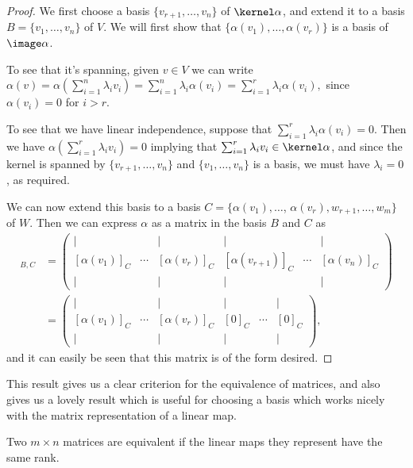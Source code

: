 \begin{proof}
    We first choose a basis $\{v_{r + 1}, \dots, v_n\}$ of $\kernel \alpha$, and extend it to a basis $B = \{v_1, \dots, v_n\}$ of $V$.
    We will first show that $\{\alpha(v_1), \dots, \alpha(v_r)\}$ is a basis of $\image \alpha$.

    To see that it's spanning, given $v \in V$ we can write
    $\alpha(v) = \alpha\left(\sum_{i = 1}^n \lambda_i v_i\right) = \sum_{i = 1}^n \lambda_i \alpha(v_i) = \sum_{i =1}^r \lambda_i \alpha(v_i),
    $
    since $\alpha(v_i) = 0$ for $i > r$.
    
    To see that we have linear independence, suppose that $\sum_{i = 1}^r \lambda_i \alpha(v_i) = 0$. Then we have
    $
\alpha\left(\sum_{i = 1}^r \lambda_i v_i\right) = 0$ implying that
$\sum_{i = 1}^r \lambda_i v_i \in \kernel \alpha$,
    and since the kernel is spanned by $\{v_{r + 1}, \dots, v_n\}$ and $\{v_1, \dots, v_n\}$ is a basis, we must have $\lambda_i = 0$, as required.

    We can now extend this basis to a basis $C = \{\alpha(v_1), \dots$, $\alpha(v_r), w_{r + 1}, \dots, w_m \}$ of $W$. Then we can express $\alpha$ as a matrix in the basis $B$ and $C$ as
    \begin{align*}
        [\alpha]_{B, C} &=
    \begin{pmatrix}
        | &  & | & | &  & |\\
        [\alpha(v_1)]_C & \cdots & [\alpha(v_r)]_C & [\alpha(v_{r + 1})]_C & \cdots & [\alpha(v_n)]_C \\
        | &  & | & | &  & |
    \end{pmatrix} \\
    &= \begin{pmatrix}
        | &  & | & | &  & |\\
        [\alpha(v_1)]_C & \cdots & [\alpha(v_r)]_C & [0]_C & \cdots & [0]_C \\
        | &  & | & | &  & |
    \end{pmatrix},
    \end{align*}
    and it can easily be seen that this matrix is of the form desired.
\end{proof}

This result gives us a clear criterion for the equivalence of matrices, and also gives us a lovely result which is useful for choosing a basis which works nicely with the matrix representation of a linear map.

\begin{corollary}
    Two $m \times n$ matrices are equivalent if the linear maps they represent have the same rank.
\end{corollary}

